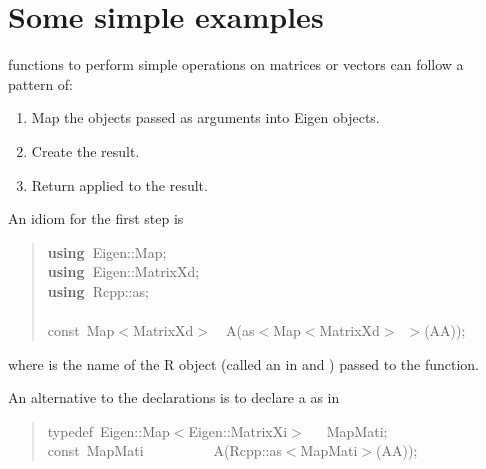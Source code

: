 \documentclass[shortnames,article]{jss}
\newcommand{\hlstd}[1]{\textcolor[rgb]{0,0,0}{#1}}
\newcommand{\hlopt}[1]{\textcolor[rgb]{0,0,0}{#1}}
\newcommand{\hlsym}[1]{\textcolor[rgb]{0,0,0}{#1}}
\newcommand{\hlkwa}[1]{\textcolor[rgb]{0.61,0.13,0.93}{\bf{#1}}}
\newcommand{\hlkwb}[1]{\textcolor[rgb]{0.13,0.54,0.13}{#1}}
\newcommand{\hlkwc}[1]{\textcolor[rgb]{0,0,1}{#1}}
\newcommand{\hlkwd}[1]{\textcolor[rgb]{0,0,0}{#1}}
\begin{document}
\section{Some simple examples}
\label{sec:simple}

 functions to perform simple operations on matrices or
vectors can follow a pattern of:
\begin{enumerate}
\item Map the  objects passed as arguments into Eigen objects.
\item Create the result.
\item Return  applied to the result.
\end{enumerate}

An idiom for the first step is
%
\begin{quote}
  \noindent
  \ttfamily
  \hlstd{}\hlkwa{using\ }\hlstd{Eigen}\hlsym{::}\hlstd{Map}\hlsym{;}\hspace*{\fill}\\
  \hlstd{}\hlkwa{using\ }\hlstd{Eigen}\hlsym{::}\hlstd{MatrixXd}\hlsym{;}\hspace*{\fill}\\
  \hlstd{}\hlkwa{using\ }\hlstd{Rcpp}\hlsym{::}\hlstd{as}\hlsym{;}\hspace*{\fill}\\
  \hlstd{}\hspace*{\fill}\\
  \hlkwb{const\ }\hlstd{Map}\hlsym{$<$}\hlstd{MatrixXd}\hlsym{$>$}\hlstd{\ \ }\hlsym{}\hlstd{}\hlkwd{A}\hlstd{}\hlsym{(}\hlstd{as}\hlsym{$<$}\hlstd{Map}\hlsym{$<$}\hlstd{MatrixXd}\hlsym{$>$\ $>$(}\hlstd{AA}\hlsym{));}\hlstd{}\hspace*{\fill}\\
  \mbox{}
  \normalfont
\end{quote}
where  is the name of the R object (called an  in
 and ) passed to the  function.

An alternative to the  declarations is to declare a  as in
\begin{quote}
  \noindent
  \ttfamily
  \hlstd{}\hlkwc{typedef\ }\hlstd{Eigen}\hlopt{::}\hlstd{Map}\hlopt{$<$}\hlstd{Eigen}\hlopt{::}\hlstd{MatrixXi}\hlopt{$>$}\hlstd{\ \ \ }\hlopt{}\hlstd{MapMati}\hlopt{;}\hspace*{\fill}\\
  \hlstd{}\hlkwb{const\ }\hlstd{MapMati}\hlstd{\ \ \ \ \ \ \ \ \ \ }\hlstd{}\hlkwd{A}\hlstd{}\hlopt{(}\hlstd{Rcpp}\hlopt{::}\hlstd{as}\hlopt{$<$}\hlstd{MapMati}\hlopt{$>$(}\hlstd{AA}\hlopt{));}\hlstd{}\hspace*{\fill}\\
  \mbox{}
  \normalfont
  \normalsize
\end{quote}
\end{document}
